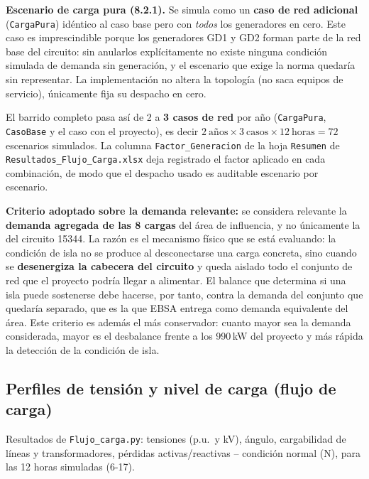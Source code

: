 \documentclass[11pt,a4paper]{article}
\begin{document}
\textbf{Escenario de carga pura (8.2.1).} Se simula como un \textbf{caso de red
adicional} (\texttt{CargaPura}) id\'entico al caso base pero con \emph{todos} los
generadores en cero. Este caso es imprescindible porque los generadores GD1 y GD2
forman parte de la red base del circuito: sin anularlos expl\'icitamente no existe
ninguna condici\'on simulada de demanda sin generaci\'on, y el escenario que exige
la norma quedar\'ia sin representar. La implementaci\'on no altera la topolog\'ia
(no saca equipos de servicio), \'unicamente fija su despacho en cero.

El barrido completo pasa as\'i de 2 a \textbf{3 casos de red} por a\~no
(\texttt{CargaPura}, \texttt{CasoBase} y el caso con el proyecto), es decir
$2\ \text{a\~nos} \times 3\ \text{casos} \times 12\ \text{horas} = 72$ escenarios
simulados. La columna \texttt{Factor\_Generacion} de la hoja \texttt{Resumen} de
\texttt{Resultados\_Flujo\_Carga.xlsx} deja registrado el factor aplicado en cada
combinaci\'on, de modo que el despacho usado es auditable escenario por escenario.

\textbf{Criterio adoptado sobre la demanda relevante:} se considera relevante la \textbf{demanda agregada de las 8 cargas} del \'area de influencia, y no \'unicamente la del circuito 15344. La raz\'on es el mecanismo f\'isico que se est\'a evaluando: la condici\'on de isla no se produce al desconectarse una carga concreta, sino cuando se \textbf{desenergiza la cabecera del circuito} y queda aislado todo el conjunto de red que el proyecto podr\'ia llegar a alimentar. El balance que determina si una isla puede sostenerse debe hacerse, por tanto, contra la demanda del conjunto que quedar\'ia separado, que es la que EBSA entrega como demanda equivalente del \'area. Este criterio es adem\'as el m\'as conservador: cuanto mayor sea la demanda considerada, mayor es el desbalance frente a los 990\,kW del proyecto y m\'as r\'apida la detecci\'on de la condici\'on de isla.

\subsection{Perfiles de tensi\'on y nivel de carga (flujo de carga)}
\label{sec:flujo-carga}
Resultados de \texttt{Flujo\_carga.py}: tensiones (p.u.\ y kV), \'angulo, cargabilidad de l\'ineas y transformadores, p\'erdidas activas/reactivas -- condici\'on normal (N), para las 12 horas simuladas (6-17).
\end{document}
